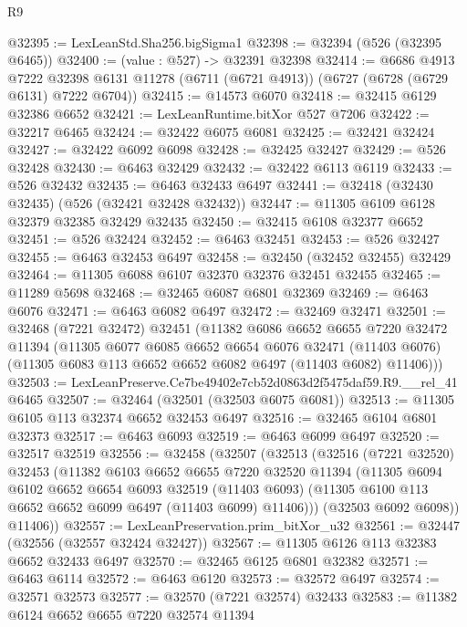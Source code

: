 \begin{lexlean}{R9}
\begin{coremodule}
@32395 := LexLeanStd.Sha256.bigSigma1
@32398 := @32394 (@526 (@32395 @6465))
@32400 := (value : @527) -> @32391 @32398
@32414 := @6686
    @4913
    @7222
    @32398
    @6131
    @11278
    (@6711 (@6721 @4913))
    (@6727 (@6728 (@6729 @6131) @7222 @6704))
@32415 := @14573 @6070
@32418 := @32415 @6129 @32386 @6652
@32421 := LexLeanRuntime.bitXor @527 @7206
@32422 := @32217 @6465
@32424 := @32422 @6075 @6081
@32425 := @32421 @32424
@32427 := @32422 @6092 @6098
@32428 := @32425 @32427
@32429 := @526 @32428
@32430 := @6463 @32429
@32432 := @32422 @6113 @6119
@32433 := @526 @32432
@32435 := @6463 @32433 @6497
@32441 := @32418 (@32430 @32435) (@526 (@32421 @32428 @32432))
@32447 := @11305 @6109 @6128 @32379 @32385 @32429 @32435
@32450 := @32415 @6108 @32377 @6652
@32451 := @526 @32424
@32452 := @6463 @32451
@32453 := @526 @32427
@32455 := @6463 @32453 @6497
@32458 := @32450 (@32452 @32455) @32429
@32464 := @11305 @6088 @6107 @32370 @32376 @32451 @32455
@32465 := @11289 @5698
@32468 := @32465 @6087 @6801 @32369
@32469 := @6463 @6076
@32471 := @6463 @6082 @6497
@32472 := @32469 @32471
@32501 := @32468
    (@7221 @32472)
    @32451
    (@11382
      @6086
      @6652
      @6655
      @7220
      @32472
      @11394
      (@11305
        @6077
        @6085
        @6652
        @6654
        @6076
        @32471
        (@11403 @6076)
        (@11305 @6083 @113 @6652 @6652 @6082 @6497 (@11403 @6082) @11406)))
@32503 := LexLeanPreserve.Ce7be49402e7cb52d0863d2f5475daf59.R9.__rel_41 @6465
@32507 := @32464 (@32501 (@32503 @6075 @6081))
@32513 := @11305 @6105 @113 @32374 @6652 @32453 @6497
@32516 := @32465 @6104 @6801 @32373
@32517 := @6463 @6093
@32519 := @6463 @6099 @6497
@32520 := @32517 @32519
@32556 := @32458
    (@32507
      (@32513
        (@32516
          (@7221 @32520)
          @32453
          (@11382
            @6103
            @6652
            @6655
            @7220
            @32520
            @11394
            (@11305
              @6094
              @6102
              @6652
              @6654
              @6093
              @32519
              (@11403 @6093)
              (@11305 @6100 @113 @6652 @6652 @6099 @6497 (@11403 @6099) @11406)))
          (@32503 @6092 @6098))
        @11406))
@32557 := LexLeanPreservation.prim_bitXor_u32
@32561 := @32447 (@32556 (@32557 @32424 @32427))
@32567 := @11305 @6126 @113 @32383 @6652 @32433 @6497
@32570 := @32465 @6125 @6801 @32382
@32571 := @6463 @6114
@32572 := @6463 @6120
@32573 := @32572 @6497
@32574 := @32571 @32573
@32577 := @32570 (@7221 @32574) @32433
@32583 := @11382 @6124 @6652 @6655 @7220 @32574 @11394

\end{coremodule}
\end{lexlean}
